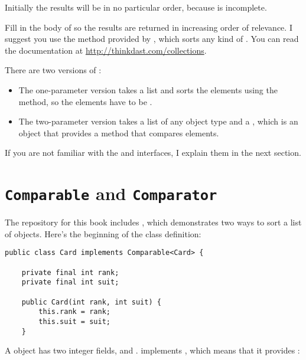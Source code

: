\documentclass[12pt]{book}
\theoremstyle{exercise}
\begin{document}
Initially the results will be in no particular order, because
 is incomplete.


Fill in the body of  so the results are returned in
increasing order of relevance. I suggest you use the 
method provided by , which sorts any kind of
. You can read the documentation at
\url{http://thinkdast.com/collections}.

There are two versions of :

\begin{itemize}

\item
  The one-parameter version takes a list and sorts the elements using
  the  method, so the elements have to be
  .

\item
  The two-parameter version takes a list of any object type and a
  , which is an object that provides a
   method that compares elements.

\end{itemize}


If you are not familiar with the  and
 interfaces, I explain them in the next section.


\section{{\tt Comparable} and {\tt Comparator}}
\label{comparable-and-comparator}


The repository for this book includes , which
demonstrates two ways to sort a list of  objects. Here's
the beginning of the class definition:

\begin{verbatim}
public class Card implements Comparable<Card> {

    private final int rank;
    private final int suit;

    public Card(int rank, int suit) {
        this.rank = rank;
        this.suit = suit;
    }
\end{verbatim}

A  object has two integer fields,  and
.  implements
, which means that it
provides :
\end{document}

